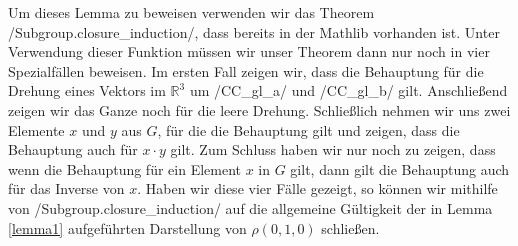 \documentclass[10pt]{article}
\begin{document}
\noindent Um dieses Lemma zu beweisen verwenden wir das Theorem \lean/Subgroup.closure_induction/, dass bereits in der Mathlib vorhanden ist. Unter Verwendung dieser Funktion müssen wir unser Theorem dann nur noch in vier Spezialfällen beweisen. Im ersten Fall zeigen wir, dass die Behauptung für die Drehung eines Vektors im $\mathbb{R}^3$ um \lean/CC_gl_a/ und \lean/CC_gl_b/ gilt. Anschließend zeigen wir das Ganze noch für die leere Drehung. Schließlich nehmen wir uns zwei Elemente $x$ und $y$ aus $G$, für die die Behauptung gilt und zeigen, dass die Behauptung auch für $x\cdot y$ gilt. Zum Schluss haben wir nur noch zu zeigen, dass wenn die Behauptung für ein Element $x$ in $G$ gilt, dann gilt die Behauptung auch für das Inverse von $x$. Haben wir diese vier Fälle gezeigt, so können wir mithilfe von \lean/Subgroup.closure_induction/ auf die allgemeine Gültigkeit der in Lemma \ref{lemma1} aufgeführten Darstellung von $\rho (0,1,0)$ schließen.

\end{document}
